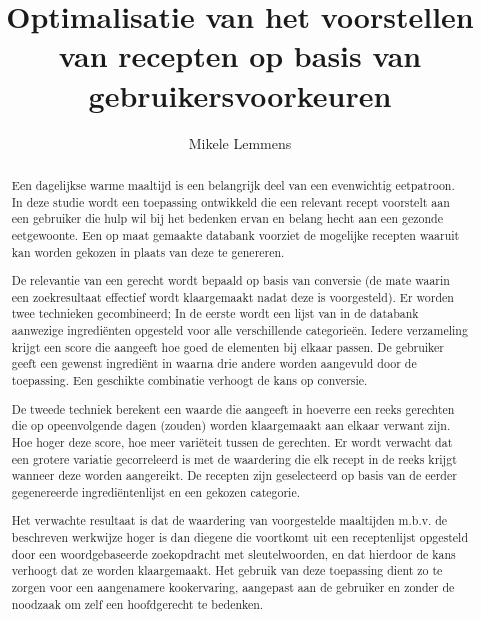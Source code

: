 \documentclass{hogent-article}
\title{Optimalisatie van het voorstellen van recepten op basis van gebruikersvoorkeuren}
\author{Mikele Lemmens}
\begin{document}
\begin{abstract}
    
Een dagelijkse warme maaltijd is een belangrijk deel van een evenwichtig eetpatroon. In deze studie wordt een toepassing ontwikkeld die een relevant recept voorstelt aan een gebruiker die hulp wil bij het bedenken ervan en belang hecht aan een gezonde eetgewoonte. Een op maat gemaakte databank voorziet de mogelijke recepten waaruit kan worden gekozen in plaats van deze te genereren.

De relevantie van een gerecht wordt bepaald op basis van conversie (de mate waarin een zoekresultaat effectief wordt klaargemaakt nadat deze is voorgesteld). Er worden twee technieken gecombineerd; In de eerste wordt een lijst van in de databank aanwezige ingrediënten opgesteld voor alle verschillende categorieën. Iedere verzameling krijgt een score die aangeeft hoe goed de elementen bij elkaar passen. De gebruiker geeft een gewenst ingrediënt in waarna drie andere worden aangevuld door de toepassing. Een geschikte combinatie verhoogt de kans op conversie.

De tweede techniek berekent een waarde die aangeeft in hoeverre een reeks gerechten die op opeenvolgende dagen (zouden) worden klaargemaakt aan elkaar verwant zijn. Hoe hoger deze score, hoe meer variëteit tussen de gerechten. Er wordt verwacht dat een grotere variatie gecorreleerd is met de waardering die elk recept in de reeks krijgt wanneer deze worden aangereikt. De recepten zijn geselecteerd op basis van de eerder gegenereerde ingrediëntenlijst en een gekozen categorie.

Het verwachte resultaat is dat de waardering van voorgestelde maaltijden m.b.v. de beschreven werkwijze hoger is dan diegene die voortkomt uit een receptenlijst opgesteld door een woordgebaseerde zoekopdracht met sleutelwoorden, en dat hierdoor de kans verhoogt dat ze worden klaargemaakt. Het gebruik van deze toepassing dient zo te zorgen voor een aangenamere kookervaring, aangepast aan de gebruiker en zonder de noodzaak om zelf een hoofdgerecht te bedenken.


\end{abstract}

\tableofcontents

\bigskip


\end{document}
